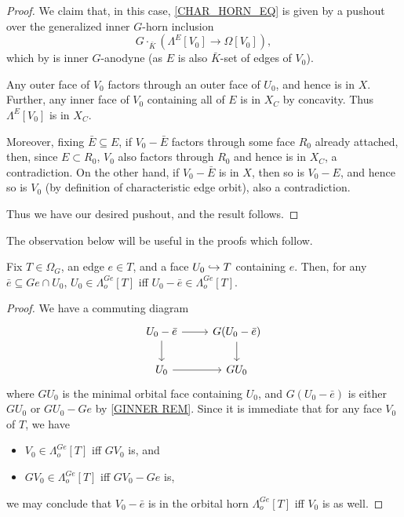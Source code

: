 \documentclass[a4paper,10pt,draft]{article}%
\begin{document}
{\begin{proof}
      We claim that, in this case, \eqref{CHAR_HORN_EQ} is given by a pushout over
      the generalized inner $G$-horn inclusion
      \begin{equation}
            G \cdot_{\bar K} \left( \Lambda^{E}[V_0] \to \Omega[V_0] \right),
      \end{equation}
      which by \cite[Proposition 6.17]{Per17} is inner $G$-anodyne
      (as $E$ is also $\bar K$-set of edges of $V_0$).
      
      Any outer face of $V_0$ factors through an outer face of $U_0$, and hence is in $X$.
      Further, any inner face of $V_0$ containing all of $E$
      is in $X_C$ by concavity.
      Thus $\Lambda^{E}[V_0]$ is in $X_C$.

      Moreover, fixing $\bar E \subseteq E$, %
      if $V_0 - \bar E$ factors through some face $R_0$ already attached,
      then, since $E \subset R_0$, $V_0$ also factors through $R_0$ and hence is in $X_C$, a contradiction.
      On the other hand,
      if $V_0 - \bar E$ is in $X$,
      then so is $V_0 - E$, and hence
      so is $V_0$ (by definition of characteristic edge orbit), also a contradiction.

      Thus we have our desired pushout, and the result follows.
\end{proof}

The observation below will be useful in the proofs which follow.
\begin{lemma}
      \label{FOF_OHORN_THM}
      Fix $T \in \Omega_G$, an edge $e \in T$, and a face $U_0 \hookrightarrow T$ containing $e$. Then,
      for any $\bar e \subseteq G e \cap U_0$,
      $U_0 \in \Lambda^{G e}_o[T]$ iff $U_0 - \bar e \in \Lambda^{G e}_o[T]$. 
\end{lemma}
\begin{proof}
      We have a commuting diagram
      \begin{equation}
            \begin{tikzcd}
                  U_0 - \bar e \arrow[r] \arrow[d]
                  &
                  G (U_0 - \bar e) \arrow[d]
                  \\
                  U_0\arrow[r]
                  &
                  G U_0
            \end{tikzcd}
      \end{equation}
      where $G U_0$ is the minimal orbital face containing $U_0$, and
      $G (U_0 - \bar e)$ is either $G U_0$ or $G U_0 - G e$ by \cref{GINNER REM}.
      Since it is immediate that for any face $V_0$ of $T$, we have
      \begin{itemize}
      \item $V_0 \in \Lambda^{G e}_o[T]$ iff $G V_0$ is, and
      \item $G V_0 \in \Lambda^{G e}_o[T]$ iff $G V_0 - G e$ is,
      \end{itemize}
      we may conclude that
      $V_0 - \bar e$ is in the orbital horn $\Lambda^{G e}_o[T]$
      iff
      $V_0$ is as well.
\end{proof}

}
\end{document}
